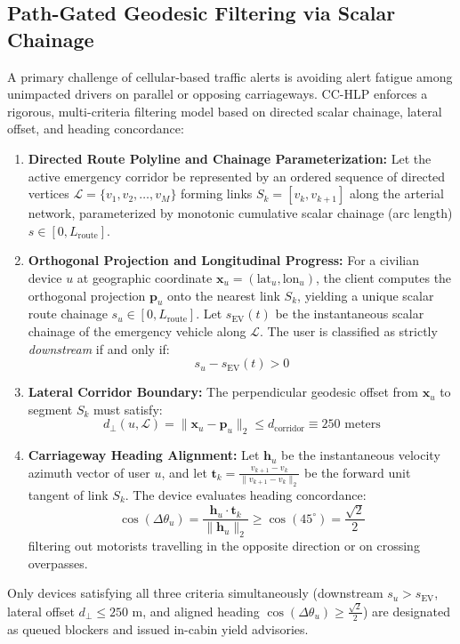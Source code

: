 \documentclass[journal,10pt,twocolumn]{IEEEtran}
\begin{document}
\subsection{Path-Gated Geodesic Filtering via Scalar Chainage}
A primary challenge of cellular-based traffic alerts is avoiding alert fatigue among unimpacted drivers on parallel or opposing carriageways. CC-HLP enforces a rigorous, multi-criteria filtering model based on directed scalar chainage, lateral offset, and heading concordance:
\begin{enumerate}
    \item \textbf{Directed Route Polyline and Chainage Parameterization:} Let the active emergency corridor be represented by an ordered sequence of directed vertices $\mathcal{L} = \{v_1, v_2, \dots, v_M\}$ forming links $S_k = [v_k, v_{k+1}]$ along the arterial network, parameterized by monotonic cumulative scalar chainage (arc length) $s \in [0, L_{\text{route}}]$.
    \item \textbf{Orthogonal Projection and Longitudinal Progress:} For a civilian device $u$ at geographic coordinate $\mathbf{x}_u = (\text{lat}_u, \text{lon}_u)$, the client computes the orthogonal projection $\mathbf{p}_u$ onto the nearest link $S_k$, yielding a unique scalar route chainage $s_u \in [0, L_{\text{route}}]$. Let $s_{\text{EV}}(t)$ be the instantaneous scalar chainage of the emergency vehicle along $\mathcal{L}$. The user is classified as strictly \emph{downstream} if and only if:
    \begin{equation}
    s_u - s_{\text{EV}}(t) > 0
    \end{equation}
    \item \textbf{Lateral Corridor Boundary:} The perpendicular geodesic offset from $\mathbf{x}_u$ to segment $S_k$ must satisfy:
    \begin{equation}
    d_{\perp}(u, \mathcal{L}) = \|\mathbf{x}_u - \mathbf{p}_u\|_2 \le d_{\text{corridor}} \equiv 250\text{ meters}
    \end{equation}
    \item \textbf{Carriageway Heading Alignment:} Let $\mathbf{h}_u$ be the instantaneous velocity azimuth vector of user $u$, and let $\mathbf{t}_k = \frac{v_{k+1} - v_k}{\|v_{k+1} - v_k\|_2}$ be the forward unit tangent of link $S_k$. The device evaluates heading concordance:
    \begin{equation}
    \cos(\Delta \theta_u) = \frac{\mathbf{h}_u \cdot \mathbf{t}_k}{\|\mathbf{h}_u\|_2} \ge \cos(45^\circ) = \frac{\sqrt{2}}{2}
    \end{equation}
    filtering out motorists travelling in the opposite direction or on crossing overpasses.
\end{enumerate}
Only devices satisfying all three criteria simultaneously (downstream $s_u > s_{\text{EV}}$, lateral offset $d_{\perp} \le 250\text{ m}$, and aligned heading $\cos(\Delta \theta_u) \ge \frac{\sqrt{2}}{2}$) are designated as queued blockers and issued in-cabin yield advisories.
\end{document}
